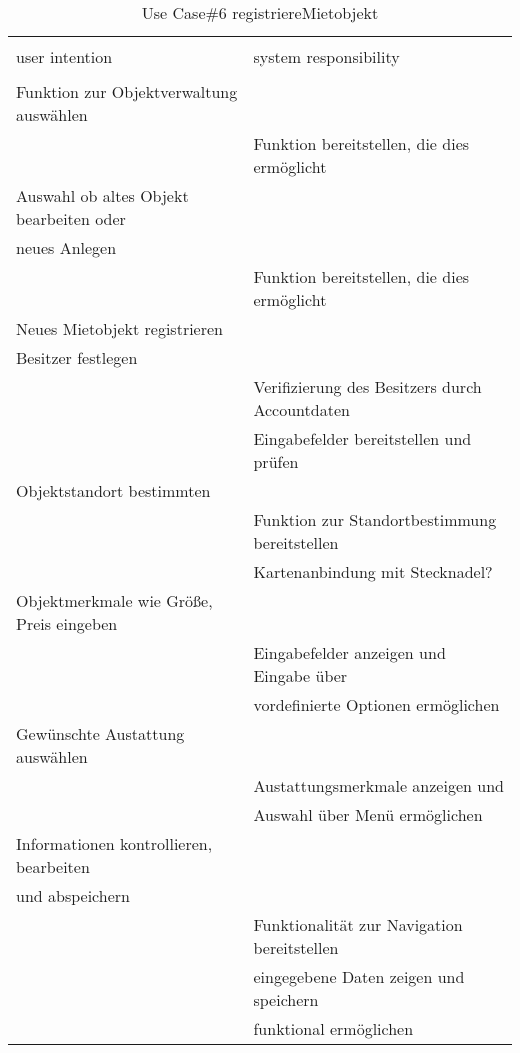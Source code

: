 \begin{table}[H]
\caption{Use Case\#6 registriereMietobjekt }
\centering
\begin{tabular}{l l}
\\ [-0.5ex]

\hline\hline
\\ [-0.5ex]
user intention & system responsibility
\\ [1.5ex]
\hline
\\ [-0.5ex]
Funktion zur Objektverwaltung auswählen		& 												\\[1ex]
											& Funktion bereitstellen, die dies ermöglicht	\\[1ex]
Auswahl ob altes Objekt bearbeiten oder		& 												\\[1ex]
neues Anlegen         						& 												\\[1ex]
											& Funktion bereitstellen, die dies ermöglicht	\\[1ex]
Neues Mietobjekt registrieren				& 											 	\\[1ex] 
Besitzer festlegen							& 											 	\\[1ex] 
											& Verifizierung des Besitzers durch Accountdaten \\[1ex]
											& Eingabefelder bereitstellen und prüfen 		\\[1ex]
Objektstandort bestimmten					& 					 							\\[1ex]
											& Funktion zur Standortbestimmung bereitstellen  \\[1ex]	
											& Kartenanbindung mit Stecknadel?			     \\[1ex]	
Objektmerkmale wie Größe, Preis eingeben	& 					 							\\[1ex]
											& Eingabefelder anzeigen und Eingabe über  		\\[1ex]
											& vordefinierte Optionen ermöglichen			\\[1ex]
Gewünschte Austattung auswählen				& 					 							\\[1ex]
											& Austattungsmerkmale anzeigen und 				\\[1ex]
											& Auswahl über Menü ermöglichen 				\\[1ex]
Informationen kontrollieren, bearbeiten 	& 												\\[1ex]
und abspeichern 							& 												\\[1ex]
										 	& Funktionalität zur Navigation bereitstellen	\\[1ex]
										 	& eingegebene Daten zeigen und speichern 		\\[1ex]
										 	& funktional ermöglichen						\\[1ex]



\hline
\end{tabular}
\label{tab:mietobjektAUC}
\end{table}


